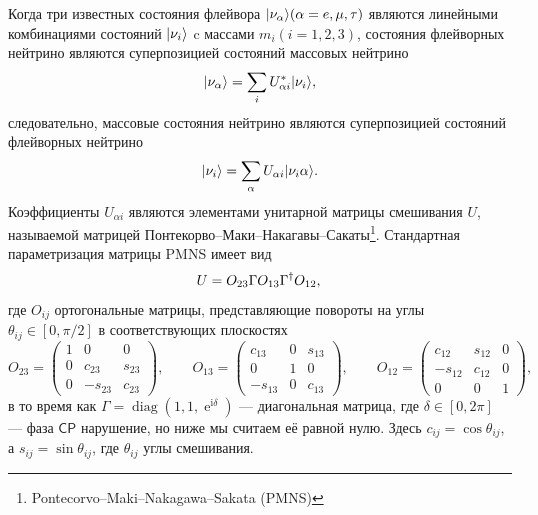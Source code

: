 \documentclass[a4paper,12pt]{article}
\newcommand{\diag}{\operatorname{diag}}
\renewcommand{\exp}{\operatorname{e}}
\renewcommand{\imath}{\mathrm{i}}
\DeclarePairedDelimiter\ket{|}{\rangle}
\begin{document}
	Когда три известных состояния флейвора \(\ket{\nu_{\alpha}} (\alpha= e, \mu, \tau)\) являются линейными комбинациями состояний \(\ket{\nu_{i}}\) c массами \(m_{i} (i=1,2,3)\), состояния флейворных нейтрино являются суперпозицией состояний
	массовых нейтрино
	\begin{equation}\label{eq:11}
		\ket{\nu_{\alpha}}=\sum_{i}U_{\alpha i}^{*}\ket{\nu_{i}},
	\end{equation}
	следовательно, массовые состояния нейтрино являются суперпозицией состояний флейворных нейтрино
	\begin{equation}\label{eq:11a}
		\ket{\nu_{i}}=\sum_{\alpha}U_{\alpha i}\ket{\nu_{i}{\alpha}}.
	\end{equation}
	Коэффициенты \(U_{\alpha i}\) являются элементами унитарной матрицы
	смешивания \(U\), называемой матрицей
	Понтекорво--Маки--Накагавы--Сакаты\footnote{Pontecorvo--Maki--Nakagawa--Sakata
	(PMNS)}. Стандартная параметризация матрицы PMNS имеет вид
	\begin{equation}
		U=O_{23}\Gamma O_{13}\Gamma^{\dagger}O_{12},\\
	\end{equation}
	где \(O_{ij}\) ортогональные матрицы, представляющие повороты на углы \(\theta_{ij}\in[0, \pi/2]\) в соответствующих плоскостях
	\begin{equation}
  		O_{23}=
  		\begin{pmatrix}
  			1 & 0 & 0\\
  			0 & c_{23} & s_{23}\\
  			0 & -s_{23} & c_{23}
  		\end{pmatrix},
		\qquad O_{13}=
  		\begin{pmatrix}
  			c_{13} & 0 & s_{13}\\
  			0 & 1 & 0\\
  			-s_{13} &0 & c_{13}
  		\end{pmatrix},
		\qquad O_{12}=
  		\begin{pmatrix}
  			c_{12} & s_{12} & 0\\
  			-s_{12} & c_{12} & 0\\
  			0 & 0 & 1
  		\end{pmatrix},
	\end{equation}
	 в то время как \(\Gamma=\diag(1,1,\exp^{\imath\delta})\) --- диагональная матрица, где
	\(\delta\in[0, 2\pi]\) --- фаза \(\mathsf{CP}\) нарушение, но ниже мы считаем
	её равной нулю. Здесь \(c_{ij}=\cos\theta_{ij}\), а \(s_{ij}=\sin\theta_{ij}\), где \(\theta_{ij}\) углы смешивания.
\end{document}
